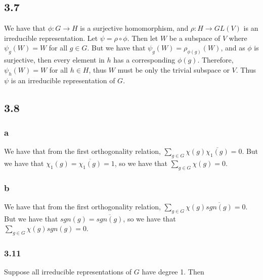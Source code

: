 \documentclass[]{article}
\begin{document}
\subsection*{3.7}
We have that $\phi: G \rightarrow H$ is a surjective homomorphism, and $\rho: H \rightarrow GL(V)$ is an irreducible representation. Let $\psi =  \rho \circ \phi$. Then let $W$ be a subspace of $V$ where $\psi_g(W) = W$ for all $g \in G$. But we have that $\psi_g(W) = \rho_{\phi(g)}(W)$, and as $\phi$ is surjective, then every element in $h$ has a corresponding $\phi(g)$. Therefore, $\psi_h(W) = W$ for all $h \in H$, thus $W$ must be only the trivial subspace or $V$. Thus $\psi$ is an irreducible representation of $G$.
\subsection*{3.8}
\subsubsection*{a}
We have that from the first orthogonality relation,
$\sum_{g \in G} \chi(g) \overline{\chi_1(g)} = 0$. But we have that $\chi_1(g) = \overline{\chi_1(g)} = 1$, so we have that $\sum_{g \in G} \chi(g) = 0$. 

\subsubsection*{b}
We have that from the first orthogonality relation,
$\sum_{g \in G} \chi(g) \overline{sgn(g)} = 0$. But we have that $sgn(g) = \overline{sgn(g)}$, so we have that $\sum_{g \in G} \chi(g)sgn(g) = 0$. 
%

\subsubsection*{3.11}
Suppose all irreducible representations of $G$ have degree 1. Then 
\end{document}
